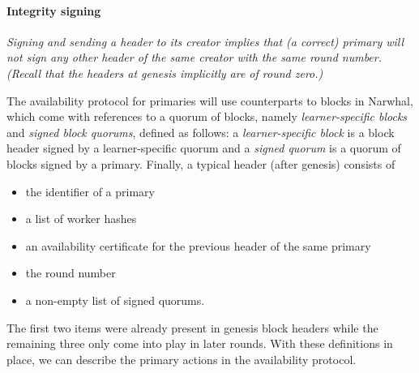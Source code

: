 \documentclass[dvipsnames]{article}
\theoremstyle{definition}
\newcommand{\xnote}[1]{
  \marginnote{\footnotesize #1}%
}
\begin{document}
\paragraph{Integrity signing}
  \xnote{⚠}
  \emph{Signing and sending a header to its creator implies that
  (a correct) primary will not sign any other header
  of the same creator with the same round number. %
  (Recall that the headers at genesis implicitly are of round zero.) %
}


The availability protocol for primaries will use
counterparts to blocks in Narwhal, 
which come with  references to a quorum of blocks,   
namely \emph{learner-specific blocks} 
and \emph{signed block quorums}, defined as follows:  
a \emph{learner-specific block} is a block header signed by a learner-specific quorum
and a \emph{signed quorum} is a quorum of blocks signed by a primary.
Finally,
a typical header (after genesis) consists of
\begin{itemize}
\item the identifier of a primary 
\item a list of worker hashes
\item an availability certificate for the previous header of the same primary
\item the round number 
\item a non-empty list of signed quorums.
\end{itemize}
The first two items were already present in genesis block headers
while the remaining three only come into play in later rounds. 
With these definitions in place,
we can describe the primary actions in the availability protocol. 
\end{document}
